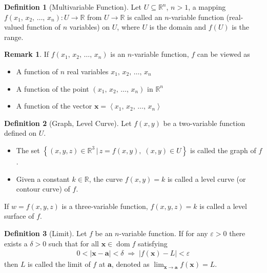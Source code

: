 \documentclass[12pt]{extarticle}
\newcommand{\ds}{\displaystyle}
\newcommand{\ie}{\;\Longrightarrow\;}
\newcommand{\llt}{\left\langle}
\newcommand{\rgt}{\right\rangle}
\DeclareMathOperator*{\dom}{dom}
\theoremstyle{definition}
\newtheorem*{dfn}{Definition}
\newtheorem*{rmk}{Remark}
\newcommand{\va}{\mathbf{a}}
\newcommand{\vx}{\mathbf{x}}
\begin{document}
\begin{dfn}[Multivariable Function]
  Let $U\subseteq\mathbb{R}^n$, $n > 1$, a mapping $f(x_1,\,x_2,\,\ldots,\,x_n):U\to\mathbb{R}$ from $U\to\mathbb{R}$ is called an $n$-variable function (real-valued function of $n$ variables) on $U$, where $U$ is the domain and $f(U)$ is the range. 
\end{dfn}

\begin{rmk} If $f(x_1,\,x_2,\,\ldots,\,x_n)$ is an $n$-variable function, $f$ can be viewed as
  \begin{multicols}{2}
    \begin{itemize}\setlength{\itemsep}{0pt}
      \item A function of $n$ real variables $x_1,\,x_2,\,\ldots,\,x_n$
      \item A function of the point $(x_1,\,x_2,\,\ldots,\,x_n)$ in $\mathbb{R}^n$
      \item A function of the vector $\vx = \llt x_1,\,x_2,\,\ldots,\,x_n\rgt$
    \end{itemize}
  \end{multicols}
\end{rmk}

\begin{dfn}[Graph, Level Curve]
  Let $f(x, y)$ be a two-variable function defined on $U$. 
  \begin{itemize}\setlength{\itemsep}{0pt}
    \item The set $\ds\left\{(x, y, z)\in\mathbb{R}^3\,|\,z = f(x, y),\;(x, y)\in U\right\}$ is called the graph of $f$. 
    \item Given a constant $k\in\mathbb{R}$, the curve $f(x, y) = k$ is called a level curve (or contour curve) of $f$. 
  \end{itemize}
  If $w = f(x, y, z)$ is a three-variable function, $f(x, y, z) = k$ is called a level surface of $f$. 
\end{dfn}

\begin{dfn}[Limit] Let $f$ be an $n$-variable function. If for any $\varepsilon > 0$ there exists a $\delta > 0$ such that for all $\vx\in\dom f$ satisfying 
  \begin{align*}
    0 < |\vx - \va| < \delta \ie |f(\vx) - L| < \varepsilon
  \end{align*}
  then $L$ is called the limit of $f$ at $\va$, denoted as $\ds\lim_{\vx\to\va}f(\vx) = L$. 
\end{dfn}
\end{document}
